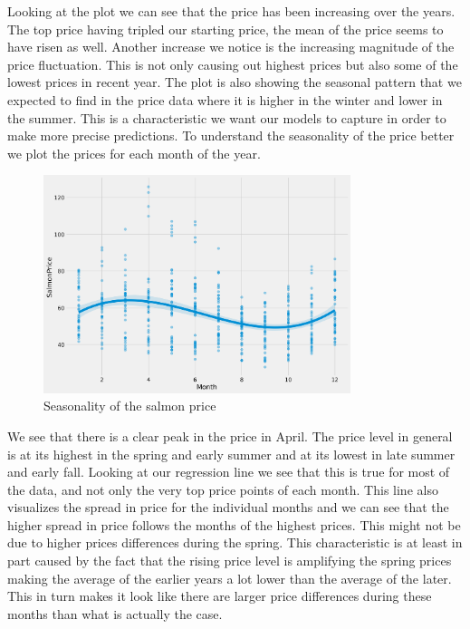 Looking at the plot we can see that the price has been increasing over the years. The top price having tripled our starting price, the mean of the price seems to have risen as well. Another increase we notice is the increasing magnitude of the price fluctuation. This is not only causing out highest prices but also some of the lowest prices in recent year. The plot is also showing the seasonal pattern that we expected to find in the price data where it is higher in the winter and lower in the summer. This is a characteristic we want our models to capture in order to make more precise predictions. To understand the seasonality of the price better we plot the prices for each month of the year.

\begin{figure}[H]
    \centering
    \includegraphics[width=0.8\textwidth]{data/Figures/Descriptive/seasonality.png}
    \caption[Seasonality of the salmon price]{Seasonality of the salmon price}\label{fig:Seasonality of the salmon price}
\end{figure}

We see that there is a clear peak in the price in April. The price level in general is at its highest in the spring and early summer and at its lowest in late summer and early fall. Looking at our regression line we see that this is true for most of the data, and not only the very top price points of each month. This line also visualizes the spread in price for the individual months and we can see that the higher spread in price follows the months of the highest prices. This might not be due to higher prices differences during the spring. This characteristic is at least in part caused by the fact that the rising price level is amplifying the spring prices making the average of the earlier years a lot lower than the average of the later. This in turn makes it look like there are larger price differences during these months than what is actually the case.

